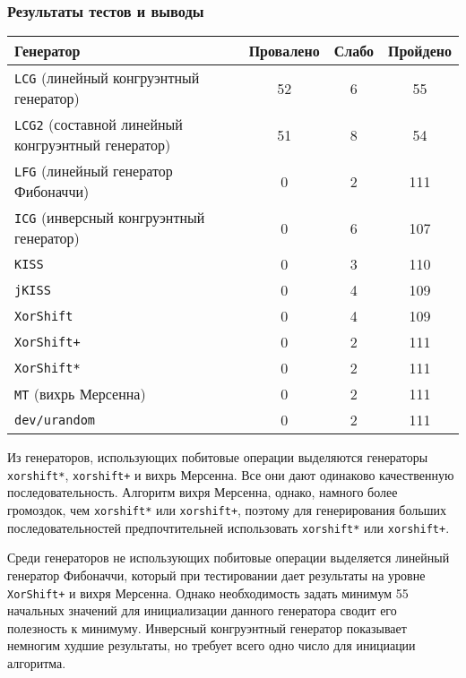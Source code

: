 \documentclass[%
floatfix,
showkeys,
nofootinbib, %
superscriptaddress, %
]{revtex4-1}
\begin{document}
\subsubsection{Результаты тестов и выводы}

\begin{center}
    \begin{tabular}{ | l | c | c | c |}
    \hline
    \textbf{Генератор} & \textbf{Провалено} & \textbf{Слабо} & \textbf{Пройдено} \\ \hline\hline
                \texttt{LCG} (линейный конгруэнтный генератор) & 52 & 6 & 55 \\ \hline
                \texttt{LCG2} (составной линейный конгруэнтный генератор) & 51 & 8 & 54 \\ \hline
                \texttt{LFG} (линейный генератор Фибоначчи) & 0 & 2 & 111 \\ \hline
                \texttt{ICG} (инверсный конгруэнтный генератор) & 0 & 6 & 107 \\ \hline
                \texttt{KISS} & 0 & 3 & 110 \\ \hline
                \texttt{jKISS} & 0 & 4 & 109 \\ \hline
                \texttt{XorShift} & 0 & 4 & 109 \\ \hline
                \texttt{XorShift+} & 0 & 2 & 111  \\ \hline
                \texttt{XorShift*} & 0 & 2 & 111 \\ \hline
                \texttt{MT} (вихрь Мерсенна) & 0 & 2 & 111 \\ \hline
                \texttt{dev/urandom} & 0 & 2 & 111              \\ \hline
    \hline
    \end{tabular}
\end{center}

Из генераторов, использующих побитовые операции выделяются генераторы
\texttt{xorshift*}, \texttt{xorshift+} и вихрь Мерсенна. Все они дают
одинаково качественную последовательность. Алгоритм вихря Мерсенна,
однако, намного более громоздок, чем \texttt{xorshift*} или
\texttt{xorshift+}, поэтому для генерирования больших
последовательностей предпочтительней использовать \texttt{xorshift*}
или \texttt{xorshift+}.

Среди генераторов не использующих побитовые операции выделяется
линейный генератор Фибоначчи, который при тестировании дает результаты
на уровне \texttt{XorShift+} и вихря Мерсенна. Однако необходимость
задать минимум 55 начальных значений для инициализации данного
генератора сводит его полезность к минимуму. Инверсный конгруэнтный
генератор показывает немногим худшие результаты, но требует всего одно
число для инициации алгоритма.
\end{document}
